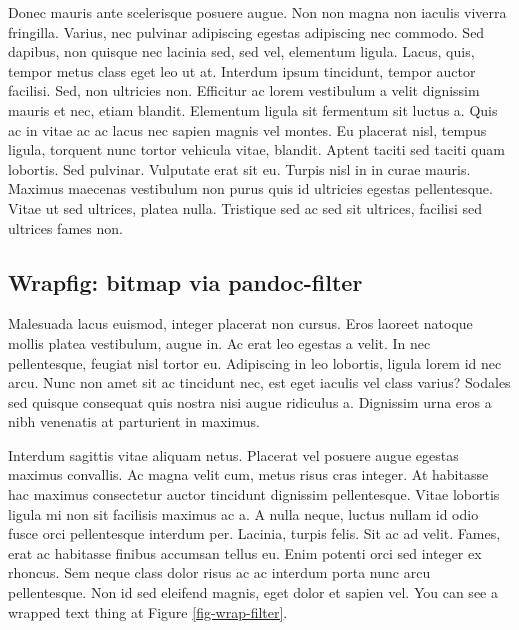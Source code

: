 \documentclass[
  9pt,
  letterpaper,
  DIV=11,
  numbers=noendperiod]{scrartcl}
\begin{document}
Donec mauris ante scelerisque posuere augue. Non non magna non iaculis
viverra fringilla. Varius, nec pulvinar adipiscing egestas adipiscing
nec commodo. Sed dapibus, non quisque nec lacinia sed, sed vel,
elementum ligula. Lacus, quis, tempor metus class eget leo ut at.
Interdum ipsum tincidunt, tempor auctor facilisi. Sed, non ultricies
non. Efficitur ac lorem vestibulum a velit dignissim mauris et nec,
etiam blandit. Elementum ligula sit fermentum sit luctus a. Quis ac in
vitae ac ac lacus nec sapien magnis vel montes. Eu placerat nisl, tempus
ligula, torquent nunc tortor vehicula vitae, blandit. Aptent taciti sed
taciti quam lobortis. Sed pulvinar. Vulputate erat sit eu. Turpis nisl
in in curae mauris. Maximus maecenas vestibulum non purus quis id
ultricies egestas pellentesque. Vitae ut sed ultrices, platea nulla.
Tristique sed ac sed sit ultrices, facilisi sed ultrices fames non.

\newpage{}

\hypertarget{wrapfig-bitmap-via-pandoc-filter}{%
\subsection{Wrapfig: bitmap via
pandoc-filter}\label{wrapfig-bitmap-via-pandoc-filter}}

Malesuada lacus euismod, integer placerat non cursus. Eros laoreet
natoque mollis platea vestibulum, augue in. Ac erat leo egestas a velit.
In nec pellentesque, feugiat nisl tortor eu. Adipiscing in leo lobortis,
ligula lorem id nec arcu. Nunc non amet sit ac tincidunt nec, est eget
iaculis vel class varius? Sodales sed quisque consequat quis nostra nisi
augue ridiculus a. Dignissim urna eros a nibh venenatis at parturient in
maximus.

Interdum sagittis vitae aliquam netus. Placerat vel posuere augue
egestas maximus convallis. Ac magna velit cum, metus risus cras integer.
At habitasse hac maximus consectetur auctor tincidunt dignissim
pellentesque. Vitae lobortis ligula mi non sit facilisis maximus ac a. A
nulla neque, luctus nullam id odio fusce orci pellentesque interdum per.
Lacinia, turpis felis. Sit ac ad velit. Fames, erat ac habitasse finibus
accumsan tellus eu. Enim potenti orci sed integer ex rhoncus. Sem neque
class dolor risus ac ac interdum porta nunc arcu pellentesque. Non id
sed eleifend magnis, eget dolor et sapien vel. You can see a wrapped
text thing at Figure \ref{fig-wrap-filter}.
\end{document}
